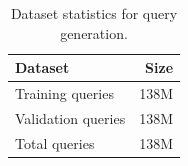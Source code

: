 \documentclass[10pt,logo,copyright]{nvidiatechreport}
\begin{document}
\clearpage
\appendix



\clearpage



\begin{table}[h!]
\centering
\caption{Dataset statistics for query generation.}
\label{tab:query_stats}
\begin{tabular}{l r}
\toprule
\textbf{Dataset} & \textbf{Size} \\
\midrule
Training queries & 138M \\
Validation queries & 138M \\
Total queries & 138M \\
\bottomrule
\end{tabular}
\end{table}
\end{document}
